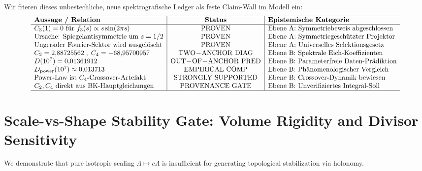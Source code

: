 \documentclass[11pt,a4paper]{article}
\theoremstyle{definition}
\begin{document}
	Wir frieren dieses unbestechliche, neue spektrografische Ledger als feste Claim-Wall im Modell ein:
	\begin{equation}
		\begin{array}{l|c|l}
			\hline
			\textbf{Aussage / Relation} & \textbf{Status} & \textbf{Epistemische Kategorie} \\
			\hline
			C_3(1) = 0 \text{ für } f_3(s) \propto s\sin(2\pi s) & \mathrm{PROVEN} & \text{Ebene A: Symmetriebeweis abgeschlossen} \\
			\text{Ursache: Spiegelantisymmetrie um } s = 1/2 & \mathrm{PROVEN} & \text{Ebene A: Symmetriegeschützter Projektor} \\
			\text{Ungerader Fourier-Sektor wird ausgelöscht} & \mathrm{PROVEN} & \text{Ebene A: Universelles Selektionsgesetz} \\
			C_2 = 2{,}88725562 \;, \; C_4 = -68{,}95700957 & \mathrm{TWO\!-\!ANCHOR\ DIAG} & \text{Ebene B: Spektrale Eich-Koeffizienten} \\
			D(10^7) = 0{,}01361912 & \mathrm{OUT\!-\!OF\!-\!ANCHOR\ PRED} & \text{Ebene B: Parameterfreie Daten-Prädiktion} \\
			D_{\mathrm{power}}(10^7) \approx 0{,}013713 & \mathrm{EMPIRICAL\ COMP} & \text{Ebene B: Phänomenologischer Vergleich} \\
			\text{Power-Law ist } C_4\text{-Crossover-Artefakt} & \mathrm{STRONGLY\ SUPPORTED} & \text{Ebene B: Crossover-Dynamik bewiesen} \\
			C_2, C_4 \text{ direkt aus BK-Hauptgleichungen} & \mathrm{PROVENANCE\ GATE} & \text{Ebene B: Unverifiziertes Integral-Soll} \\
			\hline
		\end{array}
	\end{equation}
	
	
	\section{Scale-vs-Shape Stability Gate: Volume Rigidity and Divisor Sensitivity}
	\label{sec:scale_vs_shape_stability_gate}
	
	We demonstrate that pure isotropic scaling $\Lambda \mapsto c\Lambda$ is insufficient for generating topological stabilization via holonomy.
	
\end{document}
